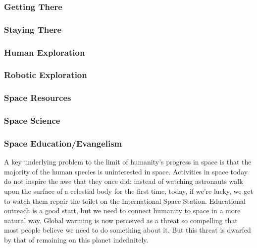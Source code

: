 
\subsubsection{Getting There}

\subsubsection{Staying There}



\subsubsection{Human Exploration}

\subsubsection{Robotic Exploration}

\subsubsection{Space Resources}

\subsubsection{Space Science}

\subsubsection{Space Education/Evangelism}

A key underlying problem to the limit  of humanity's progress in space is that the majority of the human  species is uninterested in space. Activities in space today do not  inspire the awe that they once did: instead of watching astronauts walk  upon the surface of a celestial body for the first time, today, if we're  lucky, we get to watch them repair the toilet on the International  Space Station. Educational outreach is a good start, but we need to  connect humanity to space in a more natural way. Global warming is now  perceived as a threat so compelling that most people believe we need to  do something about it. But this threat is dwarfed by that of remaining  on this planet indefinitely.

